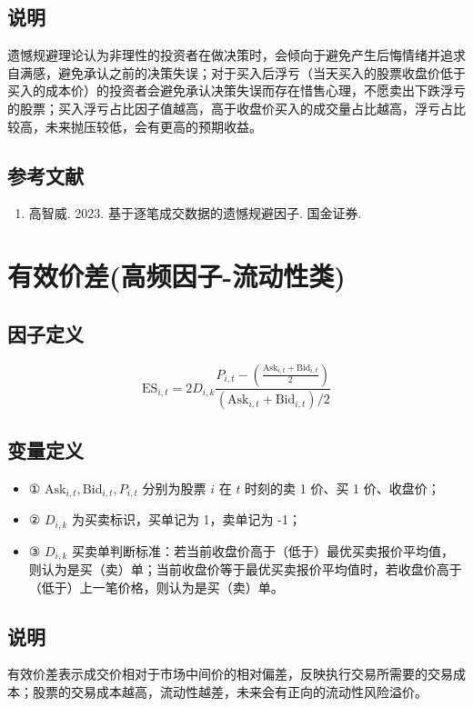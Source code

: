 \documentclass{article}
\begin{document}
\subsection{说明}
遗憾规避理论认为非理性的投资者在做决策时，会倾向于避免产生后悔情绪并追求自满感，避免承认之前的决策失误；对于买入后浮亏（当天买入的股票收盘价低于买入的成本价）的投资者会避免承认决策失误而存在惜售心理，不愿卖出下跌浮亏的股票；买入浮亏占比因子值越高，高于收盘价买入的成交量占比越高，浮亏占比较高，未来抛压较低，会有更高的预期收益。

\subsection{参考文献}
\begin{enumerate}
    \item 高智威. 2023. 基于逐笔成交数据的遗憾规避因子. 国金证券.
\end{enumerate}

\section{有效价差(高频因子-流动性类)}

\subsection{因子定义}
\begin{equation}
    \mathrm{ES}_{i,t} = 2 D_{i,k} \frac{P_{i,t} - \left( \frac{\mathrm{Ask}_{i,t} + \mathrm{Bid}_{i,t}}{2} \right)}{\left( \mathrm{Ask}_{i,t} + \mathrm{Bid}_{i,t} \right)/2}
\end{equation}

\subsection{变量定义}
\begin{itemize}
    \item ① \( \mathrm{Ask}_{i,t}, \mathrm{Bid}_{i,t}, P_{i,t} \) 分别为股票 \( i \) 在 \( t \) 时刻的卖 1 价、买 1 价、收盘价；
    \item ② \( D_{i,k} \) 为买卖标识，买单记为 1，卖单记为 -1；
    \item ③ \( D_{i,k} \) 买卖单判断标准：若当前收盘价高于（低于）最优买卖报价平均值，则认为是买（卖）单；当前收盘价等于最优买卖报价平均值时，若收盘价高于（低于）上一笔价格，则认为是买（卖）单。
\end{itemize}

\subsection{说明}
有效价差表示成交价相对于市场中间价的相对偏差，反映执行交易所需要的交易成本；股票的交易成本越高，流动性越差，未来会有正向的流动性风险溢价。
\end{document}
